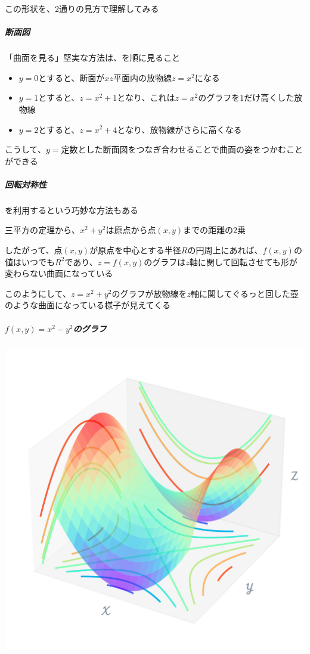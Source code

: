 \documentclass[../book_jiriki_calc]{subfiles}
\begin{document}
この形状を、2通りの見方で理解してみる

\br

\subparagraph{断面図}

「曲面を見る」堅実な方法は、を順に見ること

\begin{itemize}
  \item $y=0$とすると、断面が$xz$平面内の放物線$z=x^2$になる
  \item $y=1$とすると、$z=x^2+1$となり、これは$z=x^2$のグラフを$1$だけ高くした放物線
  \item $y=2$とすると、$z=x^2+4$となり、放物線がさらに高くなる
\end{itemize}

こうして、$y=\text{定数}$とした断面図をつなぎ合わせることで曲面の姿をつかむことができる

\br

\subparagraph{回転対称性}

を利用するという巧妙な方法もある

三平方の定理から、$x^2+y^2$は原点から点$(x, y)$までの距離の2乗

したがって、点$(x, y)$が原点を中心とする半径$R$の円周上にあれば、$f(x,y)$の値はいつでも$R^2$であり、$z=f(x,y)$のグラフは$z$軸に関して回転させても形が変わらない曲面になっている

\br

このようにして、$z=x^2+y^2$のグラフが放物線を$z$軸に関してぐるっと回した壺のような曲面になっている様子が見えてくる

\sectionline

\subparagraph{$f(x,y)=x^2-y^2$のグラフ}\quad

\includegraphics[width=0.9\linewidth]{./python/graph_x-pow2-sub-y-pow2_01.png}
\end{document}
